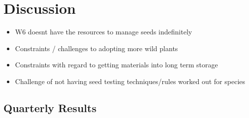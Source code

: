 \documentclass[]{article}
\providecommand{\tightlist}{%
  \setlength{\itemsep}{0pt}\setlength{\parskip}{0pt}}
\begin{document}
\section{Discussion}\label{discussion}

\begin{itemize}
\tightlist
\item
  W6 doesnt have the resources to manage seeds indefinitely
\item
  Constraints / challenges to adopting more wild plants
\item
  Constraints with regard to getting materials into long term storage
\item
  Challenge of not having seed testing techniques/rules worked out for
  species
\end{itemize}

\subsection{Quarterly Results}\label{quarterly-results}
\end{document}
